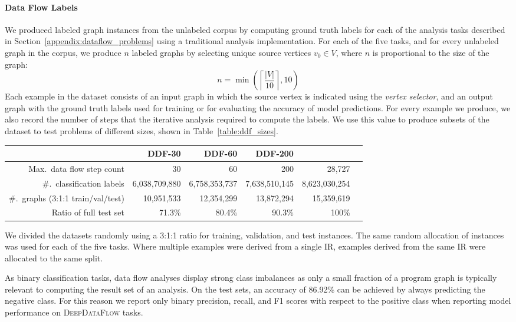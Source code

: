 \paragraph{Data Flow Labels} We produced labeled graph instances from the
unlabeled corpus by computing ground truth labels for each of the analysis tasks
described in Section~\ref{appendix:dataflow_problems} using a traditional
analysis implementation. For each of the five tasks, and for every unlabeled
graph in the corpus, we produce $n$ labeled graphs by selecting unique source
vertices $v_{0} \in V$, where $n$ is proportional to the size of the graph:
\begin{equation*}
n = \min \left( \left\lceil \frac{|V|}{10} \right\rceil, 10 \right)
\end{equation*}
Each example in the dataset consists of an input graph in which the source
vertex is indicated using the \emph{vertex selector}, and an output graph with
the ground truth labels used for training or for evaluating the accuracy of
model predictions. For every example we produce, we also record the number of
steps that the iterative analysis required to compute the labels. We use this
value to produce subsets of the dataset to test problems of different sizes,
shown in Table~\ref{table:ddf_sizes}.

\begin{table*}
\centering%
\footnotesize
\begin{tabular}{r r r r r r}
  & DDF-30 & DDF-60 & DDF-200 & \ddfinf{} \\
  \toprule
  Max.\ data flow step count & 30 & 60 & 200 & 28,727 \\
  \#.\ classification labels & 6,038,709,880 & 6,758,353,737 & 7,638,510,145 & 8,623,030,254 \\
  \#.\ graphs (3:1:1 train/val/test) & 10,951,533 & 12,354,299 & 13,872,294 & 15,359,619 \\
  Ratio of full test set & 71.3\% & 80.4\% & 90.3\% & 100\% \\
\end{tabular}
\caption{Characterization of \textsc{DeepDataFlow} subsets.}
\label{table:ddf_sizes}
\end{table*}

We divided the datasets randomly using a 3:1:1 ratio for training, validation,
and test instances. The same random allocation of instances was used for each of
the five tasks. Where multiple examples were derived from a single IR, examples
derived from the same IR were allocated to the same split.

As binary classification tasks, data flow analyses display strong class
imbalances as only a small fraction of a program graph is typically relevant to
computing the result set of an analysis. On the \ddfinf{} test sets, an accuracy
of 86.92\% can be achieved by always predicting the negative class. For this
reason we report only binary precision, recall, and F1 scores with respect to
the positive class when reporting model performance on \textsc{DeepDataFlow}
tasks.
